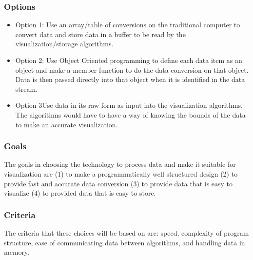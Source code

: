 \documentclass[10pt,draftclsnofoot,onecolumn,retainorgcmds]{IEEEtran}
\begin{document}
\subsubsection{Options}
\begin{itemize}
	\item Option 1: Use an array/table of conversions on the traditional computer to convert data and store data in a buffer to be read by the visualization/storage algorithms. 
	\item Option 2: Use Object Oriented programming to define each data item as an object and make a member function to do the data conversion on that object. Data is then passed directly into that object when it is identified in the data stream.
	\item Option 3Use data in its raw form as input into the visualization algorithms. The algorithms would have to have a way of knowing the bounds of the data to make an accurate visualization. \\
\end{itemize}
\subsubsection{Goals}
The goals in choosing the technology to process data and make it suitable for visualization are (1) to make a programmatically well structured design (2) to provide fast and accurate data conversion (3) to provide data that is easy to visualize (4) to provided data that is easy to store.\\
\subsubsection{Criteria}
The criteria that these choices will be based on are: speed, complexity of program structure, ease of communicating data between algorithms, and handling data in memory.\\
\end{document}
